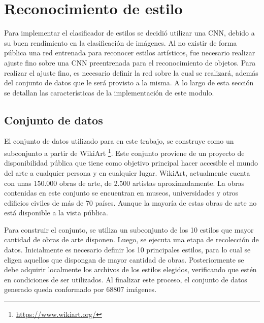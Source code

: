 \documentclass[a4paper,11pt,spanish]{book}
\begin{document}
\section{Reconocimiento de estilo}
  Para implementar el clasificador de estilos se decidió utilizar una CNN, debido a su buen rendimiento en la clasificación de imágenes.
  Al no existir de forma pública una red entrenada para reconocer estilos artísticos, fue necesario realizar ajuste fino sobre una CNN preentrenada para el 
  reconocimiento de objetos.
  Para realizar el ajuste fino, es necesario definir la red sobre la cual se realizará, además del conjunto de datos que le será provisto a la misma.
  A lo largo de esta sección se detallan las características de la implementación de este modulo.
  
  \subsection{Conjunto de datos}
    El conjunto de datos utilizado para en este trabajo, se construye como un subconjunto a partir de WikiArt \footnote{\url{https://www.wikiart.org/}}.
    Este conjunto proviene de un proyecto de disponibilidad pública que tiene como objetivo principal hacer accesible el mundo del arte a cualquier persona y en cualquier lugar.
    WikiArt, actualmente cuenta con unas 150.000 obras de arte, de 2.500 artistas aproximadamente. 
    La obras contenidas en este conjunto se encuentran en museos, universidades y otros edificios civiles de más de 70 países. 
    Aunque la mayoría de estas obras de arte no está disponible a la vista pública.
    
    Para construir el conjunto, se utiliza un subconjunto de los 10 estilos que mayor cantidad de obras de arte disponen. 
    Luego, se ejecuta una etapa de recolección de datos. 
    Inicialmente es necesario definir los 10 principales estilos, para lo cual se eligen aquellos que dispongan de mayor cantidad de obras.
    Posteriormente se debe adquirir localmente los archivos de los estilos elegidos, verificando que estén en condiciones de ser utilizados.
    Al finalizar este proceso, el conjunto de datos generado queda conformado por 68807 imágenes.
    
\end{document}
